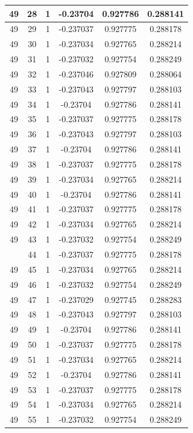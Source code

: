 \documentclass[12pt,a4paper]{article}
\numberwithin{equation}{section}
\numberwithin{figure}{section}
\numberwithin{table}{section}
\begin{document}
\begin{longtable}{|c|c|c|c|c|c|}
49 & 28 & 1 & -0.23704 & 0.927786 & 0.288141 \\ \hline
49 & 29 & 1 & -0.237037 & 0.927775 & 0.288178 \\ \hline
49 & 30 & 1 & -0.237034 & 0.927765 & 0.288214 \\ \hline
49 & 31 & 1 & -0.237032 & 0.927754 & 0.288249 \\ \hline
49 & 32 & 1 & -0.237046 & 0.927809 & 0.288064 \\ \hline
49 & 33 & 1 & -0.237043 & 0.927797 & 0.288103 \\ \hline
49 & 34 & 1 & -0.23704 & 0.927786 & 0.288141 \\ \hline
49 & 35 & 1 & -0.237037 & 0.927775 & 0.288178 \\ \hline
49 & 36 & 1 & -0.237043 & 0.927797 & 0.288103 \\ \hline
49 & 37 & 1 & -0.23704 & 0.927786 & 0.288141 \\ \hline
49 & 38 & 1 & -0.237037 & 0.927775 & 0.288178 \\ \hline
49 & 39 & 1 & -0.237034 & 0.927765 & 0.288214 \\ \hline
49 & 40 & 1 & -0.23704 & 0.927786 & 0.288141 \\ \hline
49 & 41 & 1 & -0.237037 & 0.927775 & 0.288178 \\ \hline
49 & 42 & 1 & -0.237034 & 0.927765 & 0.288214 \\ \hline
49 & 43 & 1 & -0.237032 & 0.927754 & 0.288249 \\ \hline
\pagebreak
49 & 44 & 1 & -0.237037 & 0.927775 & 0.288178 \\ \hline
49 & 45 & 1 & -0.237034 & 0.927765 & 0.288214 \\ \hline
49 & 46 & 1 & -0.237032 & 0.927754 & 0.288249 \\ \hline
49 & 47 & 1 & -0.237029 & 0.927745 & 0.288283 \\ \hline
49 & 48 & 1 & -0.237043 & 0.927797 & 0.288103 \\ \hline
49 & 49 & 1 & -0.23704 & 0.927786 & 0.288141 \\ \hline
49 & 50 & 1 & -0.237037 & 0.927775 & 0.288178 \\ \hline
49 & 51 & 1 & -0.237034 & 0.927765 & 0.288214 \\ \hline
49 & 52 & 1 & -0.23704 & 0.927786 & 0.288141 \\ \hline
49 & 53 & 1 & -0.237037 & 0.927775 & 0.288178 \\ \hline
49 & 54 & 1 & -0.237034 & 0.927765 & 0.288214 \\ \hline
49 & 55 & 1 & -0.237032 & 0.927754 & 0.288249 \\ \hline

\end{longtable}
\end{document}
